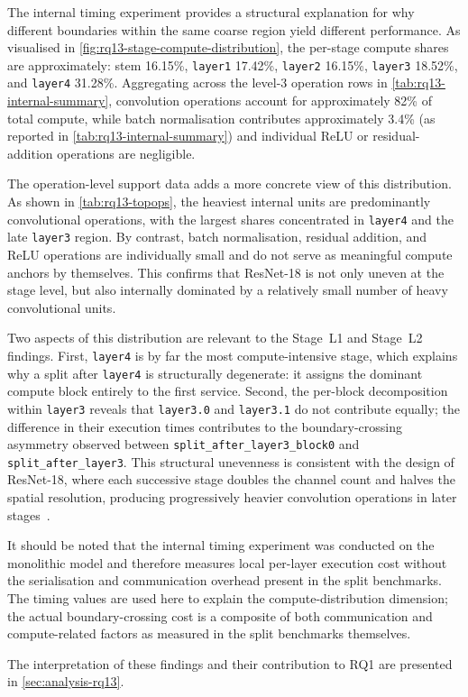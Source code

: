 The internal timing experiment provides a structural explanation for why different boundaries within the same coarse region yield different performance. As visualised in \cref{fig:rq13-stage-compute-distribution}, the per-stage compute shares are approximately: stem 16.15\%, \texttt{layer1} 17.42\%, \texttt{layer2} 16.15\%, \texttt{layer3} 18.52\%, and \texttt{layer4} 31.28\%. Aggregating across the level-3 operation rows in \cref{tab:rq13-internal-summary}, convolution operations account for approximately 82\% of total compute, while batch normalisation contributes approximately 3.4\% (as reported in \cref{tab:rq13-internal-summary}) and individual ReLU or residual-addition operations are negligible.

The operation-level support data adds a more concrete view of this distribution. As shown in \cref{tab:rq13-topops}, the heaviest internal units are predominantly convolutional operations, with the largest shares concentrated in \texttt{layer4} and the late \texttt{layer3} region. By contrast, batch normalisation, residual addition, and ReLU operations are individually small and do not serve as meaningful compute anchors by themselves. This confirms that ResNet-18 is not only uneven at the stage level, but also internally dominated by a relatively small number of heavy convolutional units.

Two aspects of this distribution are relevant to the Stage~L1 and Stage~L2 findings. First, \texttt{layer4} is by far the most compute-intensive stage, which explains why a split after \texttt{layer4} is structurally degenerate: it assigns the dominant compute block entirely to the first service. Second, the per-block decomposition within \texttt{layer3} reveals that \texttt{layer3.0} and \texttt{layer3.1} do not contribute equally; the difference in their execution times contributes to the boundary-crossing asymmetry observed between \texttt{split\_after\_layer3\_block0} and \texttt{split\_after\_layer3}. This structural unevenness is consistent with the design of ResNet-18, where each successive stage doubles the channel count and halves the spatial resolution, producing progressively heavier convolution operations in later stages~\cite{resnet}.

It should be noted that the internal timing experiment was conducted on the monolithic model and therefore measures local per-layer execution cost without the serialisation and communication overhead present in the split benchmarks. The timing values are used here to explain the compute-distribution dimension; the actual boundary-crossing cost is a composite of both communication and compute-related factors as measured in the split benchmarks themselves.

The interpretation of these findings and their contribution to RQ1 are presented
in \cref{sec:analysis-rq13}.
